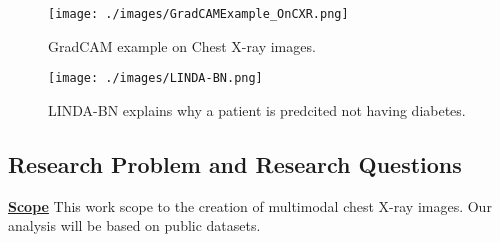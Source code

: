 \begin{figure}[!h]
    \centering
    \texttt{[image: ./images/GradCAMExample\_OnCXR.png]}
    \caption{GradCAM example on Chest X-ray images. \citep{Teixeira2021LIMEAndGradCAMOnCXR}}
    \label{fig: GradCAMExample_OnCXR}
\end{figure}

\begin{figure}[!h]
    \centering
    \texttt{[image: ./images/LINDA-BN.png]}
    \caption{LINDA-BN explains why a patient is predcited not having diabetes. \citep{Moreira2021LINDA}}
    \label{fig: LINDA-BN_diabetes}
\end{figure}



\lipsum[1]

\subsection{Research Problem and Research Questions}
\underline{\textbf{Scope}} This work scope to the creation of multimodal chest X-ray images. Our analysis will be based on public datasets. %


\noindent





